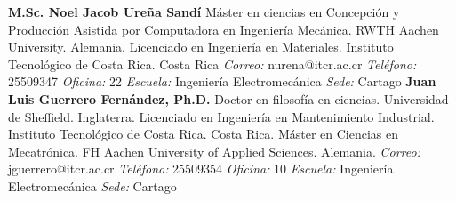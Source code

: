 \documentclass[letterpaper]{article}%
\newenvironment{textoMargen}
    {%
    \begin{list}{}{%
        \setlength{\leftmargin}{3.6cm}%
        \setlength{\rightmargin}{1.1cm}%
    }%
    \item[]%
  }
  {%
    \end{list}%
  }
\begin{document}
\vspace*{-4mm}\begin{textoMargen}\textbf{M.Sc. Noel Jacob Ureña Sandí} \newline Máster en ciencias en Concepción y Producción Asistida por Computadora en Ingeniería Mecánica. RWTH Aachen University. Alemania. \newline \newline  Licenciado en Ingeniería en Materiales. Instituto Tecnológico de Costa Rica. Costa Rica \newline \newline \emph{Correo:} nurena@itcr.ac.cr\emph{  Teléfono:} 25509347 \vspace*{1mm} \newline \emph{  Oficina:} 22\emph{  Escuela:} Ingeniería Electromecánica\emph{  Sede:} Cartago \vspace*{4mm} \newline \textbf{Juan Luis Guerrero Fernández, Ph.D.} \newline Doctor en filosofía en ciencias. Universidad de Sheffield. Inglaterra. \newline \newline  Licenciado en Ingeniería en Mantenimiento Industrial. Instituto Tecnológico de Costa Rica. Costa Rica. \newline \newline  Máster en Ciencias en Mecatrónica. FH Aachen University of Applied Sciences. Alemania. \newline \newline \emph{Correo:} jguerrero@itcr.ac.cr\emph{  Teléfono:} 25509354 \vspace*{1mm} \newline \emph{  Oficina:} 10\emph{  Escuela:} Ingeniería Electromecánica\emph{  Sede:} Cartago \vspace*{4mm} \newline \end{textoMargen}%
\end{document}
